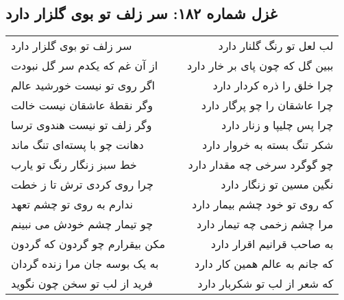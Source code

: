 \begin{center}
\section*{غزل شماره ۱۸۲: سر زلف تو بوی گلزار دارد}
\label{sec:182}
\begin{longtable}{l p{0.5cm} r}
سر زلف تو بوی گلزار دارد
&&
لب لعل تو رنگ گلنار دارد
\\
از آن غم که یکدم سر گل نبودت
&&
ببین گل که چون پای بر خار دارد
\\
اگر روی تو نیست خورشید عالم
&&
چرا خلق را ذره کردار دارد
\\
وگر نقطهٔ عاشقان نیست خالت
&&
چرا عاشقان را چو پرگار دارد
\\
وگر زلف تو نیست هندوی ترسا
&&
چرا پس چلیپا و زنار دارد
\\
دهانت چو با پسته‌ای تنگ ماند
&&
شکر تنگ بسته به خروار دارد
\\
خط سبز زنگار رنگ تو یارب
&&
چو گوگرد سرخی چه مقدار دارد
\\
چرا روی کردی ترش تا ز خطت
&&
نگین مسین تو زنگار دارد
\\
ندارم به روی تو چشم تعهد
&&
که روی تو خود چشم بیمار دارد
\\
چو تیمار چشم خودش می نبینم
&&
مرا چشم زخمی چه تیمار دارد
\\
مکن بیقرارم چو گردون که گردون
&&
به صاحب قرانیم اقرار دارد
\\
به یک بوسه جان مرا زنده گردان
&&
که جانم به عالم همین کار دارد
\\
فرید از لب تو سخن چون نگوید
&&
که شعر از لب تو شکربار دارد
\\
\end{longtable}
\end{center}
